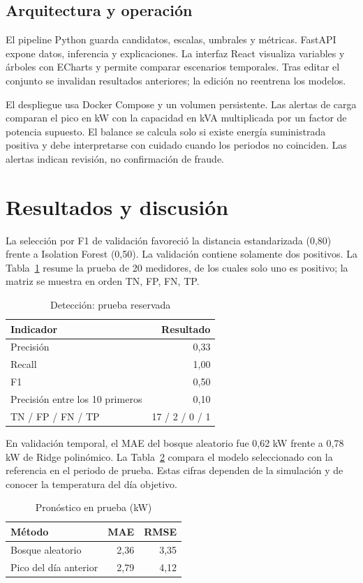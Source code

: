 \documentclass[conference]{IEEEtran}
\begin{document}
\subsection{Arquitectura y operación}
El pipeline Python guarda candidatos, escalas, umbrales y métricas. FastAPI expone datos, inferencia y explicaciones. La interfaz React visualiza variables y árboles con ECharts y permite comparar escenarios temporales. Tras editar el conjunto se invalidan resultados anteriores; la edición no reentrena los modelos.

El despliegue usa Docker Compose y un volumen persistente. Las alertas de carga comparan el pico en kW con la capacidad en kVA multiplicada por un factor de potencia supuesto. El balance se calcula solo si existe energía suministrada positiva y debe interpretarse con cuidado cuando los periodos no coinciden. Las alertas indican revisión, no confirmación de fraude.
\section{Resultados y discusión}
La selección por F1 de validación favoreció la distancia estandarizada (0,80) frente a Isolation Forest (0,50). La validación contiene solamente dos positivos. La Tabla~\ref{tab:anom} resume la prueba de 20 medidores, de los cuales solo uno es positivo; la matriz se muestra en orden TN, FP, FN, TP.
\begin{table}[h]
\caption{Detección: prueba reservada}
\label{tab:anom}
\centering
\begin{tabular}{lr}
\hline
Indicador & Resultado\\
\hline
Precisión & 0,33\\
Recall & 1,00\\
F1 & 0,50\\
Precisión entre los 10 primeros & 0,10\\
TN / FP / FN / TP & 17 / 2 / 0 / 1\\
\hline
\end{tabular}
\end{table}

En validación temporal, el MAE del bosque aleatorio fue 0,62 kW frente a 0,78 kW de Ridge polinómico. La Tabla~\ref{tab:forecast} compara el modelo seleccionado con la referencia en el periodo de prueba. Estas cifras dependen de la simulación y de conocer la temperatura del día objetivo.
\begin{table}[h]
\caption{Pronóstico en prueba (kW)}
\label{tab:forecast}
\centering
\begin{tabular}{lrr}
\hline
Método & MAE & RMSE\\
\hline
Bosque aleatorio & 2,36 & 3,35\\
Pico del día anterior & 2,79 & 4,12\\
\hline
\end{tabular}
\end{table}
\end{document}
